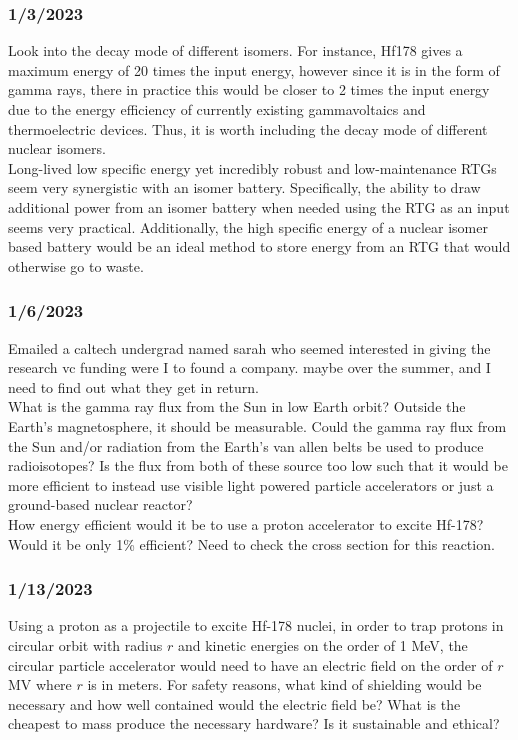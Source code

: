 \documentclass[12pt]{article}
\begin{document}
\subsubsection{1/3/2023}
Look into the decay mode of different isomers. For instance, Hf178 gives a maximum energy of 20 times the input energy, however since it is in the form of gamma rays, there in practice this would be closer to 2 times the input energy due to the energy efficiency of currently existing gammavoltaics and thermoelectric devices. Thus, it is worth including the decay mode of different nuclear isomers. \\
Long-lived low specific energy yet incredibly robust and low-maintenance RTGs seem very synergistic with an isomer battery. Specifically, the ability to draw additional power from an isomer battery when needed using the RTG as an input seems very practical. Additionally, the high specific energy of a nuclear isomer based battery would be an ideal method to store energy from an RTG that would otherwise go to waste. 
\subsubsection{1/6/2023}
Emailed a caltech undergrad named sarah who seemed interested in giving the research vc funding were I to found a company. maybe over the summer, and I need to find out what they get in return. \\
What is the gamma ray flux from the Sun in low Earth orbit? Outside the Earth's magnetosphere, it should be measurable. Could the gamma ray flux from the Sun and/or radiation from the Earth's van allen belts be used to produce radioisotopes? Is the flux from both of these source too low such that it would be more efficient to instead use visible light powered particle accelerators or just a ground-based nuclear reactor? \\
How energy efficient would it be to use a proton accelerator to excite Hf-178? Would it be only 1\% efficient? Need to check the cross section for this reaction. 
\subsubsection{1/13/2023}
Using a proton as a projectile to excite Hf-178 nuclei, in order to trap protons in circular orbit with radius $r$ and kinetic energies on the order of 1 MeV, the circular particle accelerator would need to have an electric field on the order of $r$ MV where $r$ is in meters. For safety reasons, what kind of shielding would be necessary and how well contained would the electric field be? What is the cheapest to mass produce the necessary hardware? Is it sustainable and ethical?
\end{document}
